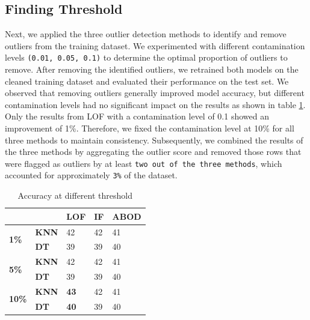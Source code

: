 \subsection{Finding Threshold}
Next, we applied the three outlier detection methods to identify and remove outliers from the training dataset.
We experimented with different contamination levels \texttt{(0.01, 0.05, 0.1)} to 
determine the optimal proportion of outliers to remove.
After removing the identified outliers, we retrained both models on the cleaned training dataset and evaluated their performance on the test set.
We observed that removing outliers generally improved model accuracy, but different contamination levels had no significant impact on the results as shown in table \ref{tab: threshold}.
Only the results from LOF with a contamination level of 0.1 showed an improvement of 1\%. 
Therefore, we fixed the contamination level at 10\% for all three methods to maintain consistency. 
Subsequently, we combined the results of the three methods by aggregating the outlier score and 
removed those rows that were flagged as outliers by at least \texttt{two out of the three methods}, 
which accounted for approximately \texttt{3\%} of the dataset.


\begin{table}[]
\centering
\begin{tabular}{|l|l|l|l|l|}
\hline
 &  & \textbf{LOF} & \textbf{IF} & \textbf{ABOD} \\ \hline
\multirow{2}{*}{\textbf{1\%}} & \textbf{KNN} & 42 & 42 & 41 \\ \cline{2-5} 
 & \textbf{DT} & 39 & 39 & 40 \\ \hline
\multirow{2}{*}{\textbf{5\%}} & \textbf{KNN} & 42 & 42 & 41 \\ \cline{2-5} 
 & \textbf{DT} & 39 & 39 & 40 \\ \hline
\multirow{2}{*}{\textbf{10\%}} & \textbf{KNN} & \textbf{43} & 42 & 41 \\ \cline{2-5} 
 & \textbf{DT} & \textbf{40} & 39 & 40 \\ \hline
\end{tabular}
\caption{Accuracy at different threshold}
\label{tab: threshold}
\end{table}

